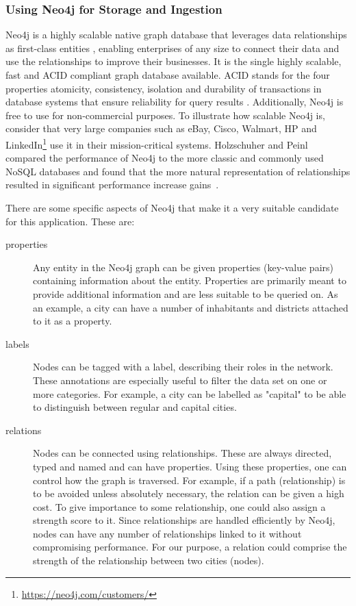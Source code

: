 \subsubsection{Using Neo4j for Storage and Ingestion}
Neo4j is a highly scalable native graph database that leverages data relationships as first-class entities \cite{neo4j}, enabling enterprises of any size to connect their data and use the relationships to improve their businesses. It is the single highly scalable, fast and ACID compliant graph database available. ACID stands for the four properties atomicity, consistency, isolation and durability of transactions in database systems that ensure reliability for query results \cite{haerder1983principles}. Additionally, Neo4j is free to use for non-commercial purposes. To illustrate how scalable Neo4j is, consider that very large companies such as eBay, Cisco, Walmart, HP and LinkedIn\footnote{\url{https://neo4j.com/customers/}} use it in their mission-critical systems. Holzschuher and Peinl compared the performance of Neo4j to the more classic and commonly used NoSQL databases and found that the more natural representation of relationships resulted in significant performance increase gains~\cite{holzschuher2013performance}.

There are some specific aspects of Neo4j that make it a very suitable candidate for this application. These are:

\begin{description}
\item[properties] Any entity in the Neo4j graph can be given properties (key-value pairs) containing information about the entity. Properties are primarily meant to provide additional information and are less suitable to be queried on. As an example, a city can have a number of inhabitants and districts attached to it as a property.
\item[labels] Nodes can be tagged with a label, describing their roles in the network. These annotations are especially useful to filter the data set on one or more categories. For example, a city can be labelled as "capital" to be able to distinguish between regular and capital cities.
\item[relations] Nodes can be connected using relationships. These are always directed, typed and named and can have properties. Using these properties, one can control how the graph is traversed. For example, if a path (relationship) is to be avoided unless absolutely necessary, the relation can be given a high cost. To give importance to some relationship, one could also assign a strength score to it. Since relationships are handled efficiently by Neo4j, nodes can have any number of relationships linked to it without compromising performance. For our purpose, a relation could comprise the strength of the relationship between two cities (nodes).
\end{description}

